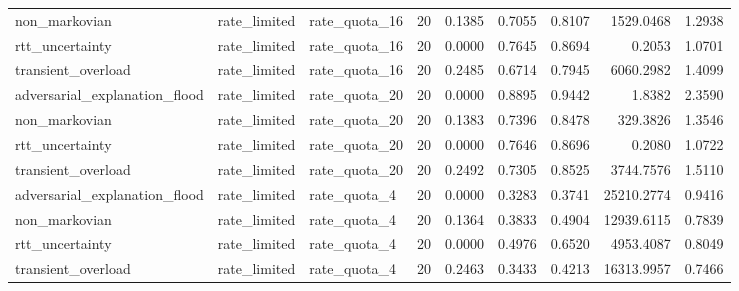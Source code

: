 \begin{table}[t]
\begin{tabular}{lllrrrrrr}
non\_markovian & rate\_limited & rate\_quota\_16 & 20 & 0.1385 & 0.7055 & 0.8107 & 1529.0468 & 1.2938 \\
rtt\_uncertainty & rate\_limited & rate\_quota\_16 & 20 & 0.0000 & 0.7645 & 0.8694 & 0.2053 & 1.0701 \\
transient\_overload & rate\_limited & rate\_quota\_16 & 20 & 0.2485 & 0.6714 & 0.7945 & 6060.2982 & 1.4099 \\
adversarial\_explanation\_flood & rate\_limited & rate\_quota\_20 & 20 & 0.0000 & 0.8895 & 0.9442 & 1.8382 & 2.3590 \\
non\_markovian & rate\_limited & rate\_quota\_20 & 20 & 0.1383 & 0.7396 & 0.8478 & 329.3826 & 1.3546 \\
rtt\_uncertainty & rate\_limited & rate\_quota\_20 & 20 & 0.0000 & 0.7646 & 0.8696 & 0.2080 & 1.0722 \\
transient\_overload & rate\_limited & rate\_quota\_20 & 20 & 0.2492 & 0.7305 & 0.8525 & 3744.7576 & 1.5110 \\
adversarial\_explanation\_flood & rate\_limited & rate\_quota\_4 & 20 & 0.0000 & 0.3283 & 0.3741 & 25210.2774 & 0.9416 \\
non\_markovian & rate\_limited & rate\_quota\_4 & 20 & 0.1364 & 0.3833 & 0.4904 & 12939.6115 & 0.7839 \\
rtt\_uncertainty & rate\_limited & rate\_quota\_4 & 20 & 0.0000 & 0.4976 & 0.6520 & 4953.4087 & 0.8049 \\
transient\_overload & rate\_limited & rate\_quota\_4 & 20 & 0.2463 & 0.3433 & 0.4213 & 16313.9957 & 0.7466 \\
\bottomrule
\end{tabular}
\end{table}
